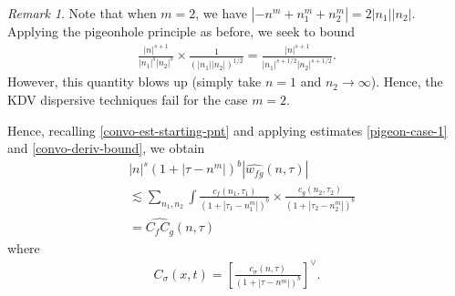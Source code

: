 \documentclass[12pt,reqno]{amsart}
\numberwithin{equation}{section}  %
\numberwithin{figure}{section}
\newcommand{\wh}{\widehat}
\theoremstyle{plain}
\theoremstyle{definition}
\theoremstyle{remark}
\newtheorem{remark}{Remark}
\begin{document}
%
%
\begin{remark}
	Note that when $m=2$, we have $|-n^{m} + n_{1}^{m} + n_{2}^{m}| = 2| n_1 |
	|n_2|$. Applying the pigeonhole principle as before, we seek to bound 
	\begin{equation*}
		\begin{split}
			\frac{| n |^{s+1}}{| n_1 |^s |n_2|^s} \times \frac{1}{(| n_1 | |n_2
			|)^{1/2}} = \frac{| n |^{s+1}}{|n_{1}|^{s + 1/2}| n_2 |^{s+1/2}}.
		\end{split}
	\end{equation*}
	However, this quantity blows up (simply take $n=1$ and $n_2 \to \infty$).
	Hence, the KDV dispersive techniques fail for the case $m=2$. 
\end{remark}
%
Hence, recalling \eqref{convo-est-starting-pnt} and applying estimates 
\eqref{pigeon-case-1} and \eqref{convo-deriv-bound}, we obtain
%
%
\begin{equation}
	\label{non-lin-rep-with-bound}
	\begin{split}
		& |n|^s \left( 1 + | \tau - n^{m } | \right)^{b} | 
		\wh{w_{fg}}(n, \tau) | 
		\\
		& \lesssim \sum_{n_1,n_2} \int \frac{c_f(n_1, \tau_1)}{\left( 1 + | 
		\tau_1 -  n_1^{m }| \right)^{b}}
		\times \frac{c_g\left( n_2, \tau_2\right)}{\left( 1 + | \tau_2 -n_2^{m }|
		\right)^{b}}
		\\
		& = \wh{C_f C_g}(n, \tau)
	\end{split}
\end{equation}
%
%
where
\begin{equation*}
	\begin{split}
		C_\sigma(x,t) =
		\left[ \frac{c_\sigma(n, \tau)}{\left( 1 + | \tau - n^{m } | 
		\right)^{b}}\right]^\vee .	
	\end{split}
\end{equation*}
\end{document}
